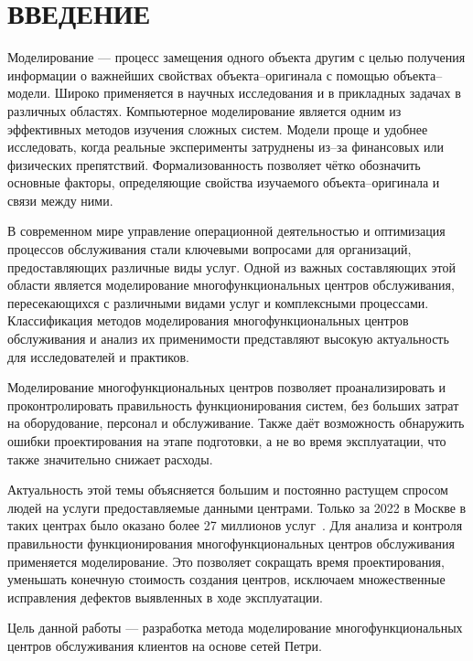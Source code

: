 \chapter*{ВВЕДЕНИЕ}

Моделирование --- процесс замещения одного объекта другим с целью получения информации о важнейших свойствах объекта--оригинала с помощью объекта--модели. Широко применяется в научных исследования и в прикладных задачах в различных областях. Компьютерное моделирование является одним из эффективных методов изучения сложных систем. Модели проще и удобнее исследовать, когда реальные эксперименты затруднены из--за финансовых или физических препятствий. Формализованность позволяет чётко обозначить основные факторы, определяющие свойства изучаемого объекта--оригинала и связи между ними.

В современном мире управление операционной деятельностью и оптимизация процессов обслуживания стали ключевыми вопросами для организаций, предоставляющих различные виды услуг. Одной из важных составляющих этой области является моделирование многофункциональных центров обслуживания, пересекающихся с различными видами услуг и комплексными процессами. Классификация методов моделирования многофункциональных центров обслуживания и анализ их применимости представляют высокую актуальность для исследователей и практиков.

Моделирование многофункциональных центров позволяет проанализировать и проконтролировать правильность функционирования систем, без больших затрат на оборудование, персонал и обслуживание. Также даёт возможность обнаружить ошибки проектирования на этапе подготовки, а не во время эксплуатации, что также значительно снижает расходы.

Актуальность этой темы объясняется большим и постоянно растущем спросом людей на услуги предоставляемые данными центрами. Только за 2022 в Москве в таких центрах было оказано более 27 миллионов услуг~\cite{actual}. Для анализа и контроля правильности функционирования многофункциональных центров обслуживания применяется моделирование. Это позволяет сокращать время проектирования, уменьшать конечную стоимость создания центров, исключаем множественные исправления дефектов выявленных в ходе эксплуатации.

Цель данной работы --- разработка метода моделирование многофункциональных центров обслуживания клиентов на основе сетей Петри.

